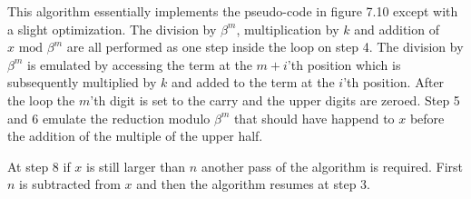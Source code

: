 \documentclass[b5paper]{book}
\begin{document}
This algorithm essentially implements the pseudo-code in figure 7.10 except with a slight optimization.  The division by $\beta^m$, multiplication by $k$
and addition of $x \mbox{ mod }\beta^m$ are all performed as one step inside the loop on step 4.  The division by $\beta^m$ is emulated by accessing
the term at the $m+i$'th position which is subsequently multiplied by $k$ and added to the term at the $i$'th position.  After the loop the $m$'th
digit is set to the carry and the upper digits are zeroed.  Step 5 and 6 emulate the reduction modulo $\beta^m$ that should have happend to 
$x$ before the addition of the multiple of the upper half.  

At step 8 if $x$ is still larger than $n$ another pass of the algorithm is required.  First $n$ is subtracted from $x$ and then the algorithm resumes
at step 3.  
\end{document}
